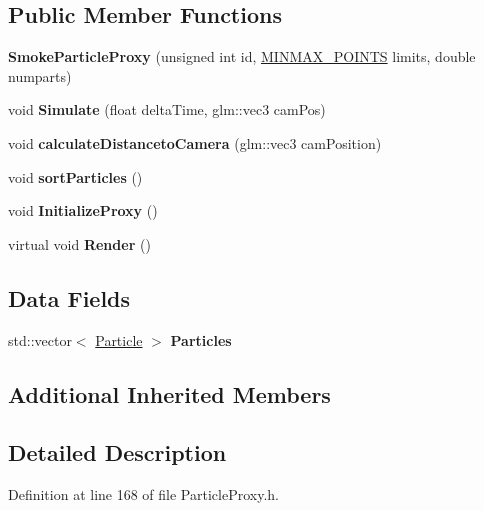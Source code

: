 \subsection*{Public Member Functions}
\begin{DoxyCompactItemize}
\item 
{\bfseries Smoke\+Particle\+Proxy} (unsigned int id, \hyperlink{struct_m_i_n_m_a_x___p_o_i_n_t_s}{M\+I\+N\+M\+A\+X\+\_\+\+P\+O\+I\+N\+TS} limits, double numparts)\hypertarget{class_smoke_particle_proxy_aabfca376c2457f19acebf441302200ba}{}\label{class_smoke_particle_proxy_aabfca376c2457f19acebf441302200ba}

\item 
void {\bfseries Simulate} (float delta\+Time, glm\+::vec3 cam\+Pos)\hypertarget{class_smoke_particle_proxy_a82a02a08a14574b5bfa5ab8dc737ac92}{}\label{class_smoke_particle_proxy_a82a02a08a14574b5bfa5ab8dc737ac92}

\item 
void {\bfseries calculate\+Distanceto\+Camera} (glm\+::vec3 cam\+Position)\hypertarget{class_smoke_particle_proxy_af47509e780adb05bf97219ee38020fc8}{}\label{class_smoke_particle_proxy_af47509e780adb05bf97219ee38020fc8}

\item 
void {\bfseries sort\+Particles} ()\hypertarget{class_smoke_particle_proxy_ab4a5be35a17690ff9691918b062990df}{}\label{class_smoke_particle_proxy_ab4a5be35a17690ff9691918b062990df}

\item 
void {\bfseries Initialize\+Proxy} ()\hypertarget{class_smoke_particle_proxy_adc955e32e951708d4c65b81c62a5f018}{}\label{class_smoke_particle_proxy_adc955e32e951708d4c65b81c62a5f018}

\item 
virtual void {\bfseries Render} ()\hypertarget{class_smoke_particle_proxy_aebe71f4d8ef74007b915d3837c8c83a8}{}\label{class_smoke_particle_proxy_aebe71f4d8ef74007b915d3837c8c83a8}

\end{DoxyCompactItemize}
\subsection*{Data Fields}
\begin{DoxyCompactItemize}
\item 
std\+::vector$<$ \hyperlink{class_particle}{Particle} $>$ {\bfseries Particles}\hypertarget{class_smoke_particle_proxy_a1792418829315de9c4fa7a6bb8e437d8}{}\label{class_smoke_particle_proxy_a1792418829315de9c4fa7a6bb8e437d8}

\end{DoxyCompactItemize}
\subsection*{Additional Inherited Members}


\subsection{Detailed Description}


Definition at line 168 of file Particle\+Proxy.\+h.

